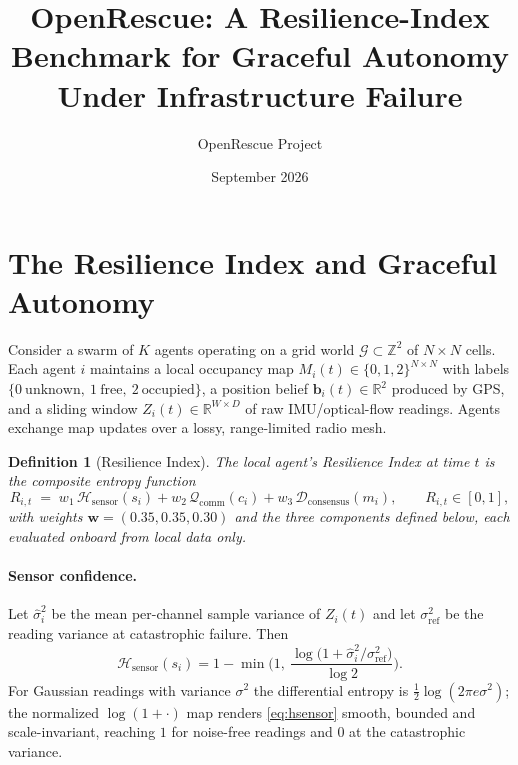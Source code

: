 \documentclass[12pt,a4paper]{article}
\title{OpenRescue: A Resilience-Index Benchmark for Graceful Autonomy Under Infrastructure Failure}
\author{OpenRescue Project}
\date{September 2026}
\DeclareRobustCommand{\cG}{\mathcal{G}}
\DeclareRobustCommand{\cH}{\mathcal{H}}
\DeclareRobustCommand{\cQ}{\mathcal{Q}}
\DeclareRobustCommand{\cD}{\mathcal{D}}
\DeclareRobustCommand{\R}{\mathbb{R}}
\DeclareRobustCommand{\Z}{\mathbb{Z}}
\DeclareRobustCommand{\vect}[1]{\bm{#1}}
\newtheorem{definition}[theorem]{Definition}
\begin{document}
\maketitle

\section{The Resilience Index and Graceful Autonomy}
\label{sec:resilience}

Consider a swarm of $K$ agents operating on a grid world
$\cG \subset \Z^2$ of $N \times N$ cells. Each agent $i$ maintains a local
occupancy map $M_i(t) \in \{0,1,2\}^{N\times N}$ with labels
$\{0\ \text{unknown},\ 1\ \text{free},\ 2\ \text{occupied}\}$, a position
belief $\vect{b}_i(t) \in \R^2$ produced by GPS, and a sliding window
$Z_i(t) \in \R^{W \times D}$ of raw IMU/optical-flow readings. Agents
exchange map updates over a lossy, range-limited radio mesh.

\begin{definition}[Resilience Index]
\label{def:ri}
The local agent's \emph{Resilience Index} at time $t$ is the composite
entropy function
\begin{equation}
R_{i,t} \;=\; w_1\, \cH_{\mathrm{sensor}}(s_i) + w_2\, \cQ_{\mathrm{comm}}(c_i)
               + w_3\, \cD_{\mathrm{consensus}}(m_i),
\qquad R_{i,t} \in [0,1],
\label{eq:ri}
\end{equation}
with weights $\vect{w} = (0.35, 0.35, 0.30)$ and the three components defined
below, each evaluated \emph{onboard} from local data only.
\end{definition}

\paragraph{Sensor confidence.}
Let $\hat\sigma_i^2$ be the mean per-channel sample variance of $Z_i(t)$ and
let $\sigma_{\mathrm{ref}}^2$ be the reading variance at catastrophic failure.
Then
\begin{equation}
\cH_{\mathrm{sensor}}(s_i)
= 1 - \min\!\Big(1,\ \frac{\log\big(1 + \hat\sigma_i^2/\sigma_{\mathrm{ref}}^2\big)}{\log 2}\Big).
\label{eq:hsensor}
\end{equation}
For Gaussian readings with variance $\sigma^2$ the differential entropy is
$\tfrac12\log(2\pi e \sigma^2)$; the normalized $\log(1+\cdot)$ map renders
\eqref{eq:hsensor} smooth, bounded and scale-invariant, reaching $1$ for
noise-free readings and $0$ at the catastrophic variance.
\end{document}
